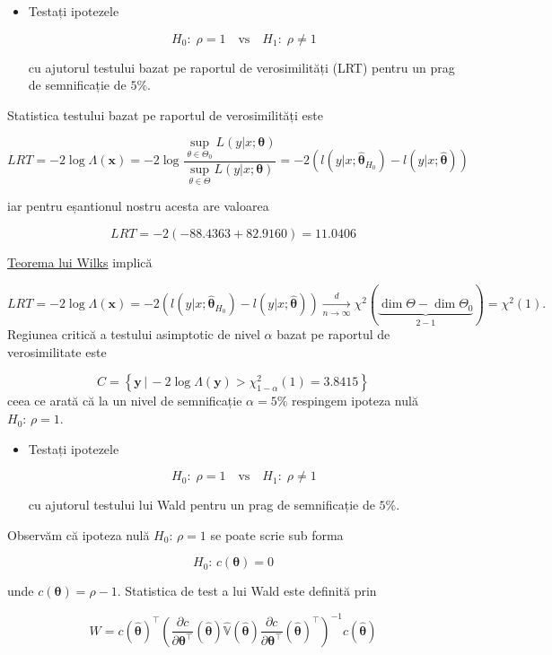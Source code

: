 \documentclass[]{article}
\newenvironment{frshaded*}{%
  \def\FrameCommand{\fboxrule=\FrameRule\fboxsep=\FrameSep \fcolorbox{framecolor}{shadecolor1}}%
  \MakeFramed {\advance\hsize-\width \FrameRestore}}%
{\endMakeFramed}
\newenvironment{rmdblock}[1]
  {\begin{frshaded*}
  \begin{itemize}
  \renewcommand{\labelitemi}{
    \raisebox{-.7\height}[0pt][0pt]{
      {\setkeys{Gin}{width=2em,keepaspectratio}\texttt{[image: images/icons/\#1]}}
    }
  }
  \item
  }
  {
  \end{itemize}
  \end{frshaded*}
  }
\newenvironment{rmdexercise}
  {\begin{rmdblock}{exercise}}
  {\end{rmdblock}}
\begin{document}
\begin{rmdexercise}
Testați ipotezele

\[
  H_0:\; \rho = 1 \quad \text{vs}\quad H_1:\; \rho\neq 1
\]

cu ajutorul testului bazat pe raportul de verosimilități (LRT) pentru un
prag de semnificație de \(5\%\).
\end{rmdexercise}

Statistica testului bazat pe raportul de verosimilități este

\[
 LRT = - 2\log{\Lambda(\mathbf{x})} = - 2 \log{\frac{\sup_{\theta\in\Theta_0}L(y|x;\boldsymbol{\theta})}{\sup_{\theta\in\Theta}L(y|x;\boldsymbol{\theta})}} = -2\left(l(y|x;\hat{\boldsymbol{\theta}}_{H_0}) - l(y|x;\hat{\boldsymbol{\theta}})\right)
\]

iar pentru eșantionul nostru acesta are valoarea

\[
LRT = -2(-88.4363 + 82.9160) = 11.0406 
\]

\href{https://en.wikipedia.org/wiki/Likelihood-ratio_test}{Teorema lui
Wilks} implică

\[
  LRT = -2\log \Lambda(\mathbf{x}) = -2\left(l(y|x;\hat{\boldsymbol{\theta}}_{H_0}) - l(y|x;\hat{\boldsymbol{\theta}})\right) \underset{n\to\infty}{\overset{d}{\longrightarrow}}\chi^2(\underbrace{\dim{\Theta} - \dim{\Theta_0}}_{2-1}) = \chi^2(1).
\] Regiunea critică a testului asimptotic de nivel \(\alpha\) bazat pe
raportul de verosimilitate este

\[
  C = \left\{\mathbf{y} \,|\, -2\log \Lambda(\mathbf{y}) > \chi^2_{1-\alpha}(1) = 3.8415\right\}
\] ceea ce arată că la un nivel de semnificație \(\alpha = 5\%\)
respingem ipoteza nulă \(H_0:\,\rho = 1\).

\begin{rmdexercise}
Testați ipotezele

\[
  H_0:\; \rho = 1 \quad \text{vs}\quad H_1:\; \rho\neq 1
\]

cu ajutorul testului lui Wald pentru un prag de semnificație de \(5\%\).
\end{rmdexercise}

Observăm că ipoteza nulă \(H_0:\,\rho = 1\) se poate scrie sub forma

\[
  H_0:\, c(\boldsymbol{\theta}) = 0
\]

unde \(c(\boldsymbol{\theta}) = \rho - 1\). Statistica de test a lui
Wald este definită prin

\[
W = c(\hat{\boldsymbol{\theta}})^\intercal\left(\frac{\partial c}{\partial \boldsymbol{\theta}^\intercal}(\hat{\boldsymbol{\theta}}) \hat{\mathbb{V}}(\hat{\boldsymbol{\theta}})\frac{\partial c}{\partial \boldsymbol{\theta}^\intercal}(\hat{\boldsymbol{\theta}})^\intercal\right)^{-1}c(\hat{\boldsymbol{\theta}})
\]
\end{document}
